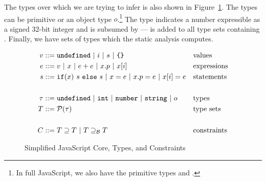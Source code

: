 The types over which we are trying to infer is also shown in
Figure~\ref{fig:js-core}. The types can be primitive or an object type
$o$.\footnote{In full JavaScript, we also have the primitive types 
  and .} The  type indicates a number expressible as a
signed 32-bit integer and is subsumed by  ---  is
added to all type sets containing . Finally, we have sets of
types which the static analysis computes.

\newcommand{\barrier}{\supseteq_\mathcal{B}}

\begin{figure}
\begin{align*}
v & ::= \code{undefined}\ |\ i\ |\ s\ |\ \text{\code{\{\}}} && \text{values}\\
e & ::= v\ |\ x\ |\ e + e\ |\ x.p\ |\ x[i]\ && \text{expressions}\\
s & ::= \code{if}(x)\ s\ \code{else}\ s\ |\ x = e\ |\ x.p = e\ |\ x[i] = e && \text{statements}\\
\\
\tau & ::= \code{undefined}\ |\ \code{int}\ |\ \code{number}\ |\ \code{string}\ |\ o && \text{types}\\
T & ::= \mathcal{P}(\tau) && \text{type sets}\\
\\
C & ::= T \supseteq T\ |\ T \barrier T && \text{constraints}
\end{align*}
\caption{Simplified JavaScript Core, Types, and Constraints}
\label{fig:js-core}
\end{figure}

